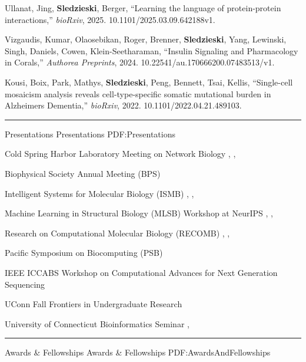 \documentclass[letterpaper,MMMyyyy,nonstopmode]{simpleresumecv}
\begin{document}
\begin{Body}
\Gap
\NumberedItem{[3]}
{{Ullanat, Jing, \textbf{Sledzieski}, Berger}, 
``Learning the language of protein-protein interactions,'' 
\textit{bioRxiv}, 2025. 10.1101/2025.03.09.642188v1.
}

\Gap
\NumberedItem{[2]}
{{Vizgaudis, Kumar, Olaosebikan, Roger, Brenner, \textbf{Sledzieski}, Yang, Lewinski, Singh, Daniels, Cowen, Klein-Seetharaman}, 
``Insulin Signaling and Pharmacology in Corals,'' 
\textit{Authorea Preprints}, 2024. 10.22541/au.170666200.07483513/v1.
}

\Gap
\NumberedItem{[1]}
{{Kousi, Boix, Park, Mathys, \textbf{Sledzieski}, Peng, Bennett, Tsai, Kellis}, 
``Single-cell mosaicism analysis reveals cell-type-specific somatic mutational burden in Alzheimers Dementia,'' 
\textit{bioRxiv}, 2022. 10.1101/2022.04.21.489103.
}



\BigGap
\hrule
\Section
{Presentations}
{Presentations}
{PDF:Presentations}

\Entry
{Cold Spring Harbor Laboratory Meeting on Network Biology}
\hfill
{}, , 
\Gap

\Entry
{Biophysical Society Annual Meeting (BPS)}
\hfill
{}
\Gap

\Entry
{Intelligent Systems for Molecular Biology (ISMB)}
\hfill
{}, , 
\Gap

\Entry
{Machine Learning in Structural Biology (MLSB) Workshop at NeurIPS}
\hfill
{}, , 
\Gap

\Entry
{Research on Computational Molecular Biology (RECOMB)}
\hfill
{}, , 
\Gap

\Entry
{Pacific Symposium on Biocomputing (PSB)}
\hfill
{}
\Gap

\Entry
{IEEE ICCABS Workshop on Computational Advances for Next Generation Sequencing}
\hfill
{}
\Gap

\Entry
{UConn Fall Frontiers in Undergraduate Research}
\hfill
{}
\Gap

\Entry
{University of Connecticut Bioinformatics Seminar}
\hfill
{}, 

\BigGap
\hrule
\Section
{Awards \&\newline
Fellowships}
{Awards \& Fellowships}
{PDF:AwardsAndFellowships}


\end{Body}
\end{document}
